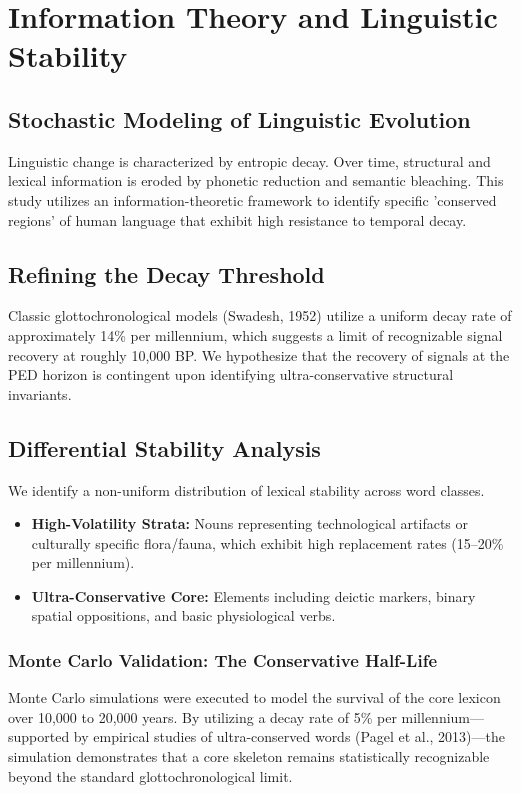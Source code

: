 \documentclass[11pt,oneside,openany]{book}
\begin{document}
\chapter{Information Theory and Linguistic Stability}

\section{Stochastic Modeling of Linguistic Evolution}
Linguistic change is characterized by entropic decay. Over time, structural and lexical information is eroded by phonetic reduction and semantic bleaching. This study utilizes an information-theoretic framework to identify specific 'conserved regions' of human language that exhibit high resistance to temporal decay.

\section{Refining the Decay Threshold}
Classic glottochronological models (Swadesh, 1952) utilize a uniform decay rate of approximately 14\% per millennium, which suggests a limit of recognizable signal recovery at roughly 10,000 BP. We hypothesize that the recovery of signals at the PED horizon is contingent upon identifying ultra-conservative structural invariants.

\section{Differential Stability Analysis}
We identify a non-uniform distribution of lexical stability across word classes. 
\begin{itemize}
    \item \textbf{High-Volatility Strata:} Nouns representing technological artifacts or culturally specific flora/fauna, which exhibit high replacement rates (15–20\% per millennium).
    \item \textbf{Ultra-Conservative Core:} Elements including deictic markers, binary spatial oppositions, and basic physiological verbs. 
\end{itemize}

\subsection{Monte Carlo Validation: The Conservative Half-Life}
Monte Carlo simulations were executed to model the survival of the core lexicon over 10,000 to 20,000 years. By utilizing a decay rate of 5\% per millennium—supported by empirical studies of ultra-conserved words (Pagel et al., 2013)—the simulation demonstrates that a core skeleton remains statistically recognizable beyond the standard glottochronological limit.
\end{document}
